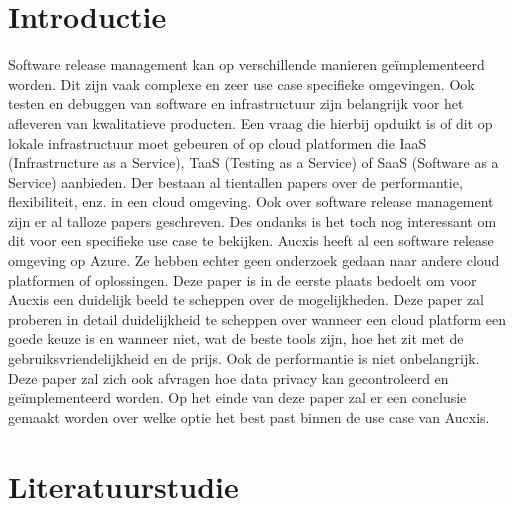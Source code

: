 
\section{Introductie} %
\label{sec:introductie}
Software release management kan op verschillende manieren geïmplementeerd worden. Dit zijn vaak complexe en zeer use case specifieke omgevingen. Ook testen en debuggen van software en infrastructuur zijn belangrijk voor het afleveren van kwalitatieve producten. Een vraag die hierbij opduikt is of dit op lokale infrastructuur moet gebeuren of op cloud platformen die IaaS (Infrastructure as a Service), TaaS (Testing as a Service) of SaaS (Software as a Service) aanbieden.
\newline
\newline
Der bestaan al tientallen papers over de performantie, flexibiliteit, enz. in een cloud omgeving. Ook over software release management zijn er al talloze papers geschreven. Des ondanks is het toch nog interessant om dit voor een specifieke use case te bekijken. Aucxis heeft al een software release omgeving op Azure. Ze hebben echter geen onderzoek gedaan naar andere cloud platformen of oplossingen. Deze paper is in de eerste plaats bedoelt om voor Aucxis een duidelijk beeld te scheppen over de mogelijkheden.
\newline
\newline
Deze paper zal proberen in detail duidelijkheid te scheppen over wanneer een cloud platform een goede keuze is en wanneer niet, wat de beste tools zijn, hoe het zit met de gebruiksvriendelijkheid en de prijs. Ook de performantie is niet onbelangrijk. Deze paper zal zich ook afvragen hoe data privacy kan gecontroleerd en geïmplementeerd worden. Op het einde van deze paper zal er een conclusie gemaakt worden over welke optie het best past binnen de use case van Aucxis.


\section{Literatuurstudie}
\label{sec:Literatuurstudie}

